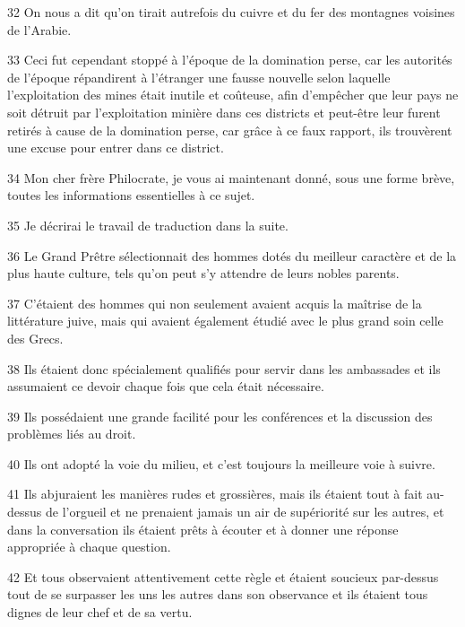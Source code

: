 \par 32 On nous a dit qu'on tirait autrefois du cuivre et du fer des montagnes voisines de l'Arabie.

\par 33 Ceci fut cependant stoppé à l'époque de la domination perse, car les autorités de l'époque répandirent à l'étranger une fausse nouvelle selon laquelle l'exploitation des mines était inutile et coûteuse, afin d'empêcher que leur pays ne soit détruit par l'exploitation minière dans ces districts et peut-être leur furent retirés à cause de la domination perse, car grâce à ce faux rapport, ils trouvèrent une excuse pour entrer dans ce district.

\par 34 Mon cher frère Philocrate, je vous ai maintenant donné, sous une forme brève, toutes les informations essentielles à ce sujet.

\par 35 Je décrirai le travail de traduction dans la suite.

\par 36 Le Grand Prêtre sélectionnait des hommes dotés du meilleur caractère et de la plus haute culture, tels qu'on peut s'y attendre de leurs nobles parents.

\par 37 C'étaient des hommes qui non seulement avaient acquis la maîtrise de la littérature juive, mais qui avaient également étudié avec le plus grand soin celle des Grecs.

\par 38 Ils étaient donc spécialement qualifiés pour servir dans les ambassades et ils assumaient ce devoir chaque fois que cela était nécessaire.

\par 39 Ils possédaient une grande facilité pour les conférences et la discussion des problèmes liés au droit.

\par 40 Ils ont adopté la voie du milieu, et c'est toujours la meilleure voie à suivre.

\par 41 Ils abjuraient les manières rudes et grossières, mais ils étaient tout à fait au-dessus de l'orgueil et ne prenaient jamais un air de supériorité sur les autres, et dans la conversation ils étaient prêts à écouter et à donner une réponse appropriée à chaque question.

\par 42 Et tous observaient attentivement cette règle et étaient soucieux par-dessus tout de se surpasser les uns les autres dans son observance et ils étaient tous dignes de leur chef et de sa vertu.

